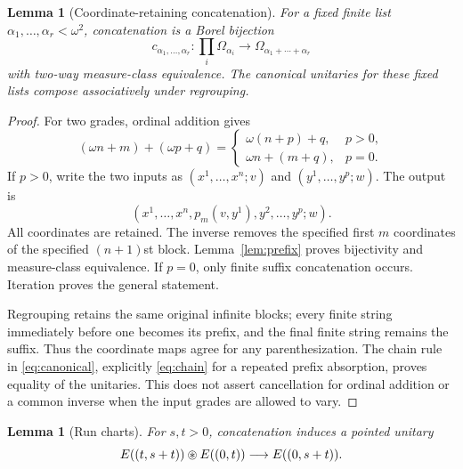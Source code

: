 \documentclass[11pt]{article}
\newtheorem{lemma}[theorem]{Lemma}
\theoremstyle{remark}\newtheorem{remark}[theorem]{Remark}
\newcommand{\Om}{\Omega}\newcommand{\dd}{\,\mathrm d}
\begin{document}
\begin{lemma}[Coordinate-retaining concatenation]\label{lem:concat}
For a fixed finite list $\alpha_1,\ldots,\alpha_r<\omega^2$, concatenation
is a Borel bijection
\[
 c_{\alpha_1,\ldots,\alpha_r}:
 \prod_i\Om_{\alpha_i}\longrightarrow\Om_{\alpha_1+\cdots+\alpha_r}
\]
with two-way measure-class equivalence. The canonical unitaries for these
fixed lists compose associatively under regrouping.
\end{lemma}

\begin{proof}
For two grades, ordinal addition gives
\[
 (\omega n+m)+(\omega p+q)=
 \begin{cases}\omega(n+p)+q,&p>0,\\\omega n+(m+q),&p=0.\end{cases}
\]
If $p>0$, write the two inputs as $(x^1,\ldots,x^n;v)$ and
$(y^1,\ldots,y^p;w)$. The output is
\[
 (x^1,\ldots,x^n,p_m(v,y^1),y^2,\ldots,y^p;w).
\]
All coordinates are retained. The inverse removes the specified first $m$
coordinates of the specified $(n+1)$st block. Lemma~\ref{lem:prefix}
proves bijectivity and measure-class equivalence. If $p=0$, only finite suffix
concatenation occurs. Iteration proves the general statement.

Regrouping retains the same original infinite blocks; every finite string
immediately before one becomes its prefix, and the final finite string remains
the suffix. Thus the coordinate maps agree for any parenthesization. The
chain rule in \eqref{eq:canonical}, explicitly \eqref{eq:chain} for a repeated
prefix absorption, proves equality of the unitaries. This does not assert
cancellation for ordinal addition or a common inverse when the input grades
are allowed to vary.
\end{proof}

\begin{lemma}[Run charts]\label{lem:runs}
For $s,t>0$, concatenation induces a pointed unitary
\[
 E((t,s+t))\mathbin{\circledast} E((0,t))\longrightarrow E((0,s+t)).
\]
\end{lemma}
\end{document}
